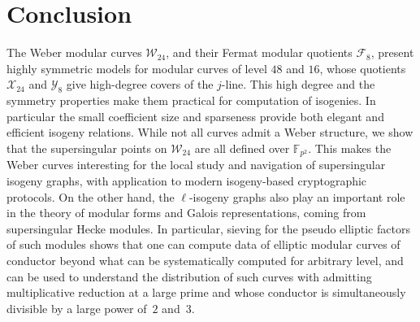 \documentclass{amsart}
\newcommand{\cF}{\mathcal{F}}
\newcommand{\cX}{\mathcal{X}}
\newcommand{\cY}{\mathcal{Y}}
\newcommand{\cW}{\mathcal{W}}
\newcommand{\FF}{\mathbb{F}}
\begin{document}

\section{Conclusion}

The Weber modular curves $\cW_{24}$, and their Fermat modular quotients $\cF_8$,
present highly symmetric models for modular curves of level $48$ and $16$, whose
quotients $\cX_{24}$ and $\cY_{8}$ give high-degree covers of the $j$-line.
This high degree and the symmetry properties make them practical for computation
of isogenies.  In particular the small coefficient size and sparseness provide
both elegant and efficient isogeny relations.  While not all curves admit a Weber
structure, we show that the supersingular points on $\cW_{24}$ are all defined
over $\FF_{p^2}$. This makes the Weber curves interesting for the local study
and navigation of supersingular isogeny graphs, with application to modern
isogeny-based cryptographic protocols.  On the other hand, the $\ell$-isogeny
graphs also play an important role in the theory of modular forms and Galois
representations, coming from supersingular Hecke modules.
In particular, sieving for the pseudo elliptic factors of such modules shows
that one can compute data of elliptic modular curves of conductor beyond what
can be systematically computed for arbitrary level, and can be used to
understand the distribution of such curves with admitting multiplicative
reduction at a large prime and whose conductor is simultaneously divisible
by a large power of~$2$ and~$3$.
\end{document}
